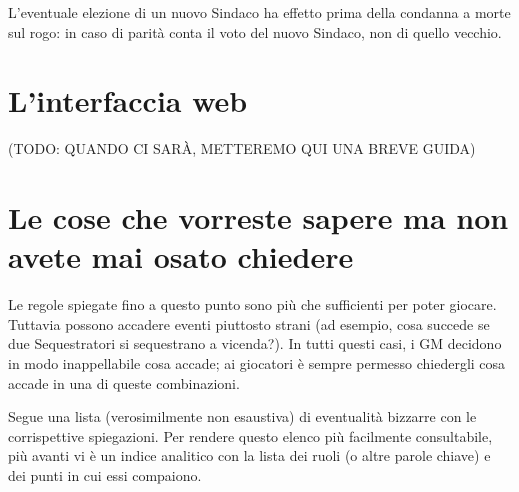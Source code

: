 \documentclass[a4paper,10pt]{article}
\begin{document}
L'eventuale elezione di un nuovo Sindaco ha effetto prima della condanna a morte sul rogo: in caso di parità conta il voto del nuovo Sindaco, non di quello vecchio.



\pagebreak
\section{L'interfaccia web}
(TODO: QUANDO CI SARÀ, METTEREMO QUI UNA BREVE GUIDA)



\section{Le cose che vorreste sapere ma non avete mai osato chiedere}
\label{faq}

Le regole spiegate fino a questo punto sono più che sufficienti per poter giocare. Tuttavia possono accadere eventi piuttosto strani (ad esempio, cosa succede se due Sequestratori si sequestrano a vicenda?). In tutti questi casi, i GM decidono in modo inappellabile cosa accade; ai giocatori è sempre permesso chiedergli cosa accade in una di queste combinazioni.

Segue una lista (verosimilmente non esaustiva) di eventualità bizzarre con le corrispettive spiegazioni.
Per rendere questo elenco più facilmente consultabile, più avanti vi è un indice analitico con la lista dei ruoli (o altre parole chiave) e dei punti in cui essi compaiono.
\end{document}
